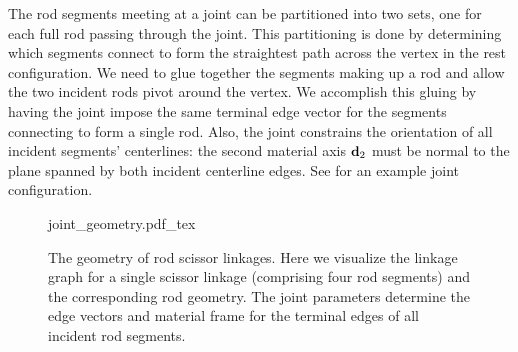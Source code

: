 \documentclass[10pt]{article}
\renewcommand{\vec}[1]{{\bf #1}}
\newcommand\pr[1]{\prettyref{#1}}
\def\d{\vec{d}}
\begin{document}
The rod segments meeting at a joint can be partitioned into two sets, one for
each full rod passing through the joint. This partitioning is done by determining
which segments connect to form the straightest path across the vertex in the
rest configuration. We need to glue together the segments making up a rod and allow
the two incident rods pivot around the vertex. We accomplish this gluing by
having the joint impose the same terminal edge vector for the segments
connecting to form a single rod. Also, the joint constrains the orientation of
all incident segments' centerlines: the second material axis $\d_2$ must be
normal to the plane spanned by both incident centerline edges. See
\pr{fig:joint_example} for an example joint configuration.

\begin{figure}[h]
    \centering
    \def\svgwidth{.5\textwidth}
    {joint_geometry.pdf_tex}
    \caption{The geometry of rod scissor linkages. Here we visualize the
    linkage graph for a single scissor linkage (comprising four rod segments)
    and the corresponding rod geometry. The joint parameters determine the edge
    vectors and material frame for the terminal edges of all incident rod
    segments.} \label{fig:joint_example}
\end{figure}
\end{document}
